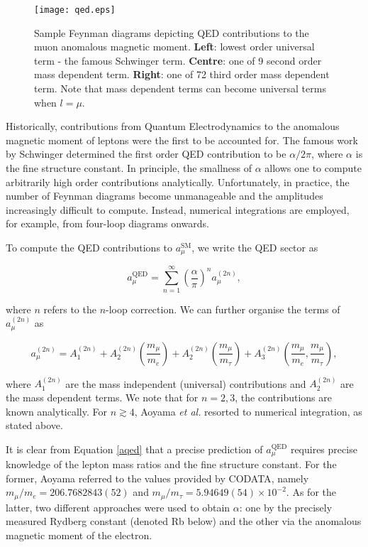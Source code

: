 \documentclass{article}
\numberwithin{equation}{section} %
\begin{document}
\begin{figure}[t]
    \centering
    \texttt{[image: qed.eps]}%
    \caption{Sample Feynman diagrams depicting QED contributions to the muon anomalous magnetic moment. \textbf{Left}: lowest order universal term - the famous Schwinger term. \textbf{Centre}: one of 9 second order mass dependent term. \textbf{Right}: one of 72 third order mass dependent term. Note that mass dependent terms can become universal terms when $l=\mu$.}%
    \label{qedfeynman}%
\end{figure}

Historically, contributions from Quantum Electrodynamics to the anomalous magnetic moment of leptons were the first to be accounted for. The famous work by Schwinger\cite{schwinger} determined the first order QED contribution to be $\alpha/2\pi$, where $\alpha$ is the fine structure constant. In principle, the smallness of $\alpha$ allows one to compute arbitrarily high order contributions analytically. Unfortunately, in practice, the number of Feynman diagrams become unmanageable and the amplitudes increasingly difficult to compute. Instead, numerical integrations are employed, for example, from four-loop diagrams onwards\cite{aoyama}.

To compute the QED contributions to $a_\mu^\mathrm{SM}$, we write the QED sector as

\begin{equation}
a_\mu^\mathrm{QED} = \sum_{n=1}^\infty \left(\frac{\alpha}{\pi}\right)^n a_\mu^{(2n)},
\label{aqed}
\end{equation}

\noindent where $n$ refers to the $n$-loop correction. We can further organise the terms of $a_\mu^{(2n)}$ as

\begin{equation}
a_\mu^{(2n)} = A_1^{(2n)} + A_2^{(2n)}\left(\frac{m_\mu}{m_e}\right) + A_2^{(2n)}\left(\frac{m_\mu}{m_\tau}\right) + A_3^{(2n)}\left(\frac{m_\mu}{m_e}, \frac{m_\mu}{m_\tau}\right),
\end{equation}

\noindent where $A_1^{(2n)}$ are the mass independent (universal) contributions and $A_2^{(2n)}$ are the mass dependent terms. We note that for $n=2,3$, the contributions are known analytically. For $n\gtrsim 4$, Aoyama \textit{et al.} resorted to numerical integration, as stated above. 

It is clear from Equation \ref{aqed} that a precise prediction of $a_\mu^\mathrm{QED}$ requires precise knowledge of the lepton mass ratios and the fine structure constant. For the former, Aoyama referred to the values provided by CODATA\cite{codata}, namely $m_\mu /m_e = 206.7682843(52)$ and $m_\mu /m_\tau = 5.94649(54) \times 10^{-2}$. As for the latter, two different approaches were used to obtain $\alpha$: one by the precisely measured Rydberg constant (denoted Rb below) and the other via the anomalous magnetic moment of the electron. 
\end{document}
